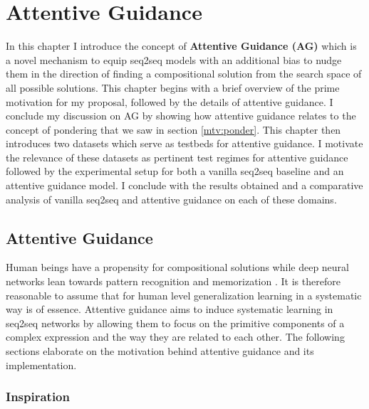 \chapter{Attentive Guidance}\label{Chapter:proposals}

In this chapter I introduce the concept of \textbf{Attentive Guidance (AG)} which is a novel mechanism to equip seq2seq models with an additional bias to nudge them in the direction of finding a compositional solution from the search space of all possible solutions. This chapter begins with a brief overview of the prime motivation for my proposal, followed by the details of attentive guidance. I conclude my discussion on AG by showing how attentive guidance relates to the concept of pondering that we saw in section \ref{mtv:ponder}. This chapter then introduces two datasets which serve as testbeds for attentive guidance. I motivate the relevance of these datasets as pertinent test regimes for attentive guidance followed by the experimental setup for both a vanilla seq2seq baseline and an attentive guidance model. I conclude with the results obtained and a comparative analysis of vanilla seq2seq and attentive guidance on each of these domains.


\section{Attentive Guidance}
Human beings have a propensity for compositional solutions \citep{NIPS2016_6130} while deep neural networks lean towards pattern recognition and memorization \citep{Marcus2018}. It is therefore reasonable to assume that for human level generalization learning in a systematic way is of essence. Attentive guidance aims to induce systematic learning in seq2seq networks by allowing them to focus on the primitive components of a complex expression and the way they are related to each other. The following sections elaborate on the motivation behind attentive guidance and its implementation.

\subsection{Inspiration} 

